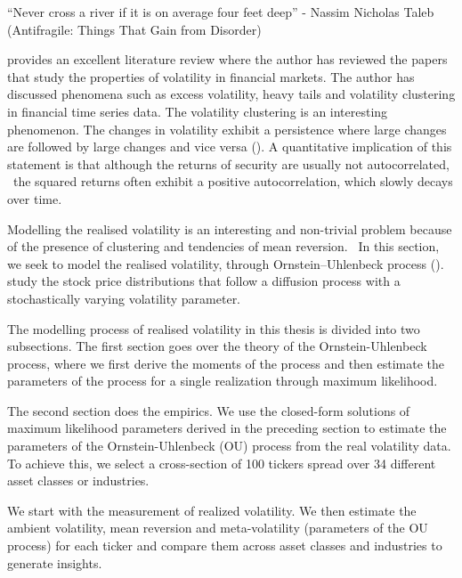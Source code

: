 
\begin{displayquote}
    “Never cross a river if it is on average four feet deep” - Nassim Nicholas Taleb (Antifragile: Things That Gain from Disorder)
    \end{displayquote}
    
    \cite{cont2005volatility} provides an excellent literature review where the author has reviewed the papers that study the properties of volatility in financial markets. The author has discussed phenomena such as excess volatility, heavy tails and volatility clustering in financial time series data. The volatility clustering is an interesting phenomenon. The changes in volatility exhibit a persistence where large changes are followed by large changes and vice versa (\cite{mandelbrot1963variation}). A quantitative implication of this statement is that although the returns of security are usually not autocorrelated,  the squared returns often exhibit a positive autocorrelation, which slowly decays over time.
    
    Modelling the realised volatility is an interesting and non-trivial problem because of the presence of clustering and tendencies of mean reversion.  In this section, we seek to model the realised volatility, through Ornstein–Uhlenbeck process (\cite{stein1991}).   \cite{stein1991} study the stock price distributions that follow a diffusion process with a stochastically varying volatility parameter.
    
    The modelling process of realised volatility in this thesis is divided into two subsections. The first section goes over the theory of the Ornstein-Uhlenbeck process, where we first derive the moments of the process and then estimate the parameters of the process for a single realization through maximum likelihood.
    
    The second section does the empirics. We use the closed-form solutions of maximum likelihood parameters derived in the preceding section to estimate the parameters of the Ornstein-Uhlenbeck (OU) process from the real volatility data. To achieve this, we select a cross-section of 100 tickers spread over 34 different asset classes or industries. 
    
    We start with the measurement of realized volatility. We then estimate the ambient volatility, mean reversion and meta-volatility (parameters of the OU process) for each ticker and compare them across asset classes and industries to generate insights.